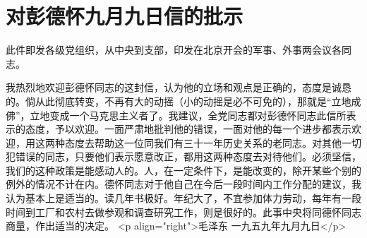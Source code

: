 \section[对彭德怀九月九日信的批示（一九五九年九月九日）]{对彭德怀九月九日信的批示}


此件即发各级党组织，从中央到支部，印发在北京开会的军事、外事两会议各同志。

我热烈地欢迎彭德怀同志的这封信，认为他的立场和观点是正确的，态度是诚恳的。倘从此彻底转变，不再有大的动摇（小的动摇是必不可免的），那就是“立地成佛”，立地变成一个马克思主义者了。我建议，全党同志都对彭德怀同志此信所表示的态度，予以欢迎。一面严肃地批判他的错误，一面对他的每一个进步都表示欢迎，用这两种态度去帮助这一位同我们有三十一年历史关系的老同志。对其他一切犯错误的同志，只要他们表示愿意改正，都用这两种态度去对待他们。必须坚信，我们的这种政策是能感动人的。人，在一定条件下，是能改变的，除开某些个别的例外的情况不计在内。德怀同志对于他自己在今后一段时间内工作分配的建议，我认为基本上是适当的。读几年书极好。年纪大了，不宜参加体力劳动，每年有一段时间到工厂和农村去做参观和调查研究工作，则是很好的。此事中央将同德怀同志商量，作出适当的决定。
<p align="right">毛泽东
一九五九年九月九日</p>


